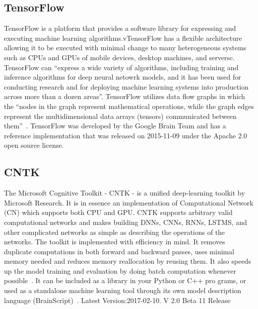     \pv
      
\subsection{TensorFlow}

TensorFlow is a platform that provides a software library for
expressing and executing machine learning algorithms.vTensorFlow has a
flexible architecture allowing it to be executed with minimal change
to many heterogeneous systems such as CPUs and GPUs of mobile devices,
desktop machines, and serversc\cite{tensorflow-paper-2016}.
TensorFlow can ``express a wide variety of algorithms, including
training and inference algorithms for deep neural netowrk models, and
it has been used for conducting research and for deploying machine
learning systems into production across more than a dozen
areas''. TensorFlow utilizes data flow graphs in which the ``nodes in
the graph represent mathematical operations, while the graph edges
represent the multidimensional data arrays (tensors) communicated
between them''~\cite{www-tensorflow}.  TensorFlow was developed by the
Google Brain Team and has a reference implementation that was released
on 2015-11-09 under the Apache 2.0 open source license.

    \pv
    
\subsection{CNTK}

The Microsoft Cognitive Toolkit - CNTK - is a unified deep-learning
toolkit by Microsoft Research. It is in essence an implementation of
Computational Network (CN) which supports both CPU and GPU. CNTK
supports arbitrary valid computational networks and makes building
DNNs, CNNs, RNNs, LSTMS, and other complicated networks as simple as
describing the operations of the networks.  The toolkit is implemented
with efficiency in mind. It removes duplicate computations in both
forward and backward passes, uses minimal memory needed and reduces
memory reallocation by reusing them. It also speeds up the model
training and evaluation by doing batch computation whenever
possible~\cite{book-cntk}. It can be included as a library in your
Python or C++ pro grams, or used as a standalone machine learning tool
through its own model description language
(BrainScript)~\cite{www-cntk}. Latest Version:2017-02-10. V 2.0 Beta
11 Release


